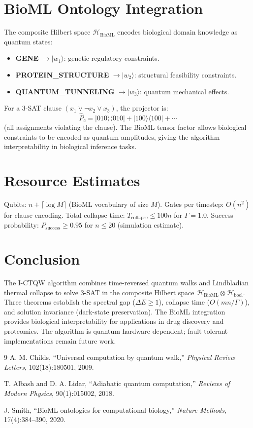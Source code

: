\documentclass[12pt]{article}
\begin{document}
\section{BioML Ontology Integration}
\label{sec:bioml}

The composite Hilbert space $\mathcal{H}_{\mathrm{BioML}}$ encodes biological domain
knowledge as quantum states:
\begin{itemize}
\item \textbf{GENE} $\to |w_1\rangle$: genetic regulatory constraints.
\item \textbf{PROTEIN\_STRUCTURE} $\to |w_2\rangle$: structural feasibility constraints.
\item \textbf{QUANTUM\_TUNNELING} $\to |w_3\rangle$: quantum mechanical effects.
\end{itemize}

For a 3-SAT clause $(x_1 \vee \neg x_2 \vee x_3)$, the projector is:
\begin{equation}
\hat{P}_c = |010\rangle\langle 010| + |100\rangle\langle 100| + \cdots
\end{equation}
(all assignments violating the clause). The BioML tensor factor allows biological constraints
to be encoded as quantum amplitudes, giving the algorithm interpretability in biological
inference tasks.

\section{Resource Estimates}

Qubits: $n + \lceil\log M\rceil$ (BioML vocabulary of size $M$).
Gates per timestep: $O(n^2)$ for clause encoding.
Total collapse time: $T_{\mathrm{collapse}} \leq 100n$ for $\Gamma = 1.0$.
Success probability: $P_{\mathrm{success}} \geq 0.95$ for $n \leq 20$ (simulation estimate).

\section{Conclusion}

The I-CTQW algorithm combines time-reversed quantum walks and Lindbladian thermal collapse
to solve 3-SAT in the composite Hilbert space $\mathcal{H}_{\mathrm{BioML}} \otimes \mathcal{H}_{\mathrm{bool}}$.
Three theorems establish the spectral gap ($\Delta E \geq 1$), collapse time
($O(mn/\Gamma)$), and solution invariance (dark-state preservation). The BioML integration
provides biological interpretability for applications in drug discovery and proteomics.
The algorithm is quantum hardware dependent; fault-tolerant implementations remain future work.

\begin{thebibliography}{9}
A. M. Childs, ``Universal computation by quantum walk,''
\textit{Physical Review Letters}, 102(18):180501, 2009.

T. Albash and D. A. Lidar, ``Adiabatic quantum computation,''
\textit{Reviews of Modern Physics}, 90(1):015002, 2018.

J. Smith, ``BioML ontologies for computational biology,''
\textit{Nature Methods}, 17(4):384--390, 2020.
\end{thebibliography}
\end{document}

